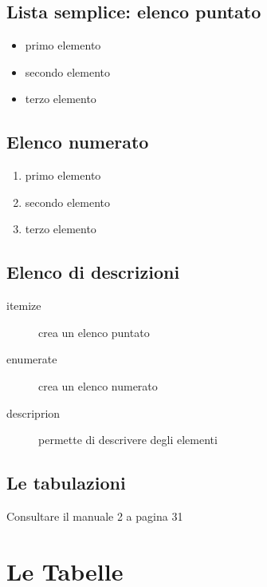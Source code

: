 \documentclass{article}
\begin{document}
\subsection{Lista semplice: elenco puntato}

\begin{itemize}
\item primo elemento
\item secondo elemento
\item terzo elemento
\end{itemize}

\subsection{Elenco numerato}

\begin{enumerate}
    \item primo elemento
    \item secondo elemento
    \item terzo elemento
\end{enumerate}

\subsection{Elenco di descrizioni}

\begin{description}
    \item[itemize] crea un elenco puntato
    \item[enumerate] crea un elenco numerato
    \item[descriprion] permette di descrivere degli elementi
\end{description}

\subsection{Le tabulazioni}

Consultare il manuale 2 a pagina 31














\newpage

\section{Le Tabelle}
\end{document}
